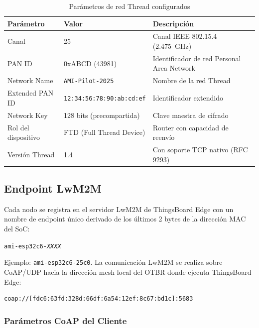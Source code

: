 \documentclass[11pt,a4paper]{article}
\begin{document}
\begin{table}[H]
\centering
\caption{Parámetros de red Thread configurados}
\label{tab:thread-params}
\begin{tabularx}{\textwidth}{l l X}
\toprule
\textbf{Parámetro} & \textbf{Valor} & \textbf{Descripción} \\
\midrule
Canal & 25 & Canal IEEE 802.15.4 (\SI{2.475}{\giga\hertz}) \\
PAN ID & 0xABCD (43981) & Identificador de red Personal Area Network \\
Network Name & \texttt{AMI-Pilot-2025} & Nombre de la red Thread \\
Extended PAN ID & \texttt{12:34:56:78:90:ab:cd:ef} & Identificador extendido \\
Network Key & 128 bits (precompartida) & Clave maestra de cifrado \\
Rol del dispositivo & FTD (Full Thread Device) & Router con capacidad de reenvío \\
Versión Thread & 1.4 & Con soporte TCP nativo (RFC 9293) \\
\bottomrule
\end{tabularx}
\end{table}

\subsection{Endpoint LwM2M}

Cada nodo se registra en el servidor LwM2M de ThingsBoard Edge con un nombre de endpoint único derivado de los últimos 2 bytes de la dirección MAC del SoC:

\begin{center}
\texttt{ami-esp32c6-\textit{XXXX}}
\end{center}

\noindent Ejemplo: \texttt{ami-esp32c6-25c0}. La comunicación LwM2M se realiza sobre CoAP/UDP hacia la dirección mesh-local del OTBR donde ejecuta ThingsBoard Edge:

\begin{lstlisting}[language=bash,caption={URI del servidor LwM2M}]
coap://[fdc6:63fd:328d:66df:6a54:12ef:8c67:bd1c]:5683
\end{lstlisting}

\subsubsection{Parámetros CoAP del Cliente}
\end{document}
